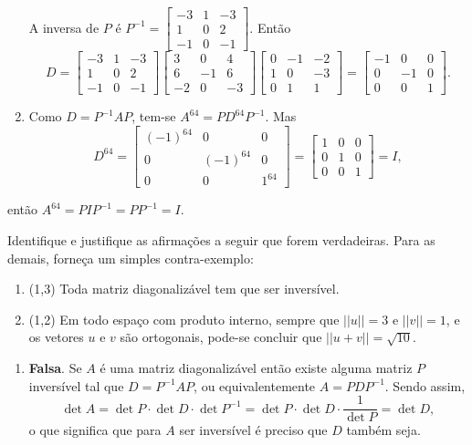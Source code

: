 \documentclass[12pt,a4paper]{article}
\newcommand{\norm}[1]{\left|\left|{#1}\right|\right|}
\begin{document}
\begin{ExerciseList}
\begin{enumerate}
A inversa de $P$ é $P ^{-1} =
\begin{bmatrix}
-3 & 1 & -3 \\
 1 & 0 &  2 \\
-1 & 0 & -1
\end{bmatrix}$. Então
\[
D =
\begin{bmatrix}
-3 & 1 & -3 \\
 1 & 0 &  2 \\
-1 & 0 & -1
\end{bmatrix}
\begin{bmatrix}
 3 &  0 &  4\\
 6 & -1 &  6\\
-2 &  0 & -3
\end{bmatrix}
\begin{bmatrix}
0 & -1 & -2 \\
1 &  0 & -3 \\
0 &  1 &  1
\end{bmatrix}
=
\begin{bmatrix}
-1 &  0 & 0 \\
 0 & -1 & 0 \\
 0 &  0 & 1
\end{bmatrix}.
\]

\item Como $D = P^{-1} A P$, tem-se $A^{64} = P D^{64} P^{-1}$. Mas
\[
D^{64}
=
\begin{bmatrix}
(-1)^{64} &  0 & 0 \\
 0 & (-1)^{64} & 0 \\
 0 &  0 & 1^{64}
\end{bmatrix}
=
\begin{bmatrix}
1 & 0 & 0 \\
0 & 1 & 0 \\
0 & 0 & 1
\end{bmatrix}
= I,
\]
\end{enumerate}
então $A^{64} = P I P^{-1} = P P^{-1} = I$.

\Exercise[title={2,5}] Identifique e justifique as afirmações a seguir que forem verdadeiras. Para as demais, forneça um simples contra-exemplo:
\begin{enumerate}
\item (1,3) Toda matriz diagonalizável tem que ser inversível.
\item (1,2) Em todo espaço com produto interno, sempre que $\norm{u} = 3$ e $\norm{v} = 1$, e os vetores $u$ e $v$ são ortogonais, pode-se concluir que $\norm{u+v} = \sqrt{10}$.

\end{enumerate}
\Answer
\begin{enumerate}
\item \textbf{Falsa}. Se $A$ é uma matriz diagonalizável então existe alguma matriz $P$ inversível tal que $D = P^{-1} A P$, ou equivalentemente $A = P D P^{-1}$. Sendo assim,
\[
\det{A}
= \det{P} \cdot \det{D} \cdot \det{P^{-1}}
= \det{P} \cdot \det{D} \cdot \frac{1}{\det{P}}
= \det{D},
\]
o que significa que para $A$ ser inversível é preciso que $D$ também seja.


\end{enumerate}
\end{ExerciseList}
\end{document}
